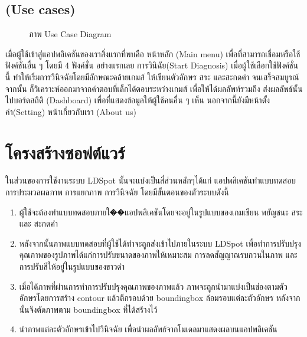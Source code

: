 \documentclass[12pt,oneside,openright,a4paper]{cpe-thai-project}
\begin{document}
\subsection{(Use cases)}
\begin{figure}[!ht]\centering
  \setlength{\fboxrule}{0.2mm} %
  \setlength{\fboxsep}{1cm}
  \caption{ภาพ Use Case Diagram}\label{fig:usecase}
\end{figure}
เมื่อผู้ใช้เข้าสู่แอปพลิเคชันของเราสิ่งแรกที่พบคือ หน้าหลัก (Main menu) เพื่อที่สามารถเชื่อมหรือใช้ฟังค์ชั่นอื่น ๆ โดยมี 4 ฟังค์ชั่น อย่างแรกเลย 
การวินิฉัย(Start Diagnosis) เมื่อผู้ใช้เลือกใช้ฟังค์ชั่นนี้ ทำให้เริ่มการวินิจฉัยโดยมีลักษณะคล้ายเกมส์ ให้เขียนตัวอักษร สระ และสะกดคำ จนเสร็จสมบูรณ์จากนั้น ก็วิเคราะห์ออกมาจากคำตอบที่เด็กได้ตอบระหว่างเกมส์ 
เพื่อให้ได้ผลลัพท์รวมถึง ส่งผลลัพธ์นั้นไปบอร์ดสถิติ (Dashboard) เพื่อที่แสดงข้อมูลให้ผู้ใช้คนอื่น ๆ เห็น นอกจากนี้ยังมีหน้าตั้งค่า(Setting) หน้าเกี่ยวกับเรา (About us) 

\section{โครงสร้างซอฟต์แวร์}
ในส่วนของการใช้งานระบบ LDSpot นั้นจะแบ่งเป็นสี่ส่วนหลักๆได้แก่ แอปพลิเคชันทำแบบทดสอบ การประมวลผลภาพ การแยกภาพ การวินิจฉัย โดยมีขั้นตอนของตัวระบบดังนี้
\begin{enumerate}
  \item ผู้ใช้จะต้องทำแบบทดสอบภายใ��แอปพลิเคชันโดยจะอยู่ในรูปแบบของเกมเขียน พยัญชนะ สระ และ สะกดคำ
  \item หลังจากนั้นภาพแบบทดสอบที่ผู้ใช้ได้ทำจะถูกส่งเข้าไปภายในระบบ LDSpot เพื่อทำการปรับปรุงคุณภาพของรูปภาพได้แก่การปรับขนาดของภาพให้เหมาะสม การลดสัญญาณรบกวนในภาพ และการปรับสีให้อยู่ในรูปแบบของขาวดำ
  \item เมื่อได้ภาพที่ผ่านการทำการปรับปรุงคุณภาพของภาพแล้ว ภาพจะถูกนำมาแบ่งเป็นช่องตามตัวอักษรโดยการสร้าง contour แล้วตีกรอบด้วย boundingbox ล้อมรอบแต่ละตัวอักษร หลังจากนั้นจึงตัดภาพตาม boundingbox ที่ได้สร้างไว้
  \item นำภาพแต่ละตัวอักษรเข้าไปวินิจฉัย เพื่อนำผลลัพธ์จากโมเดลมาแสดงผลบนแอปพลิเคชัน
\end{enumerate}
\end{document}
